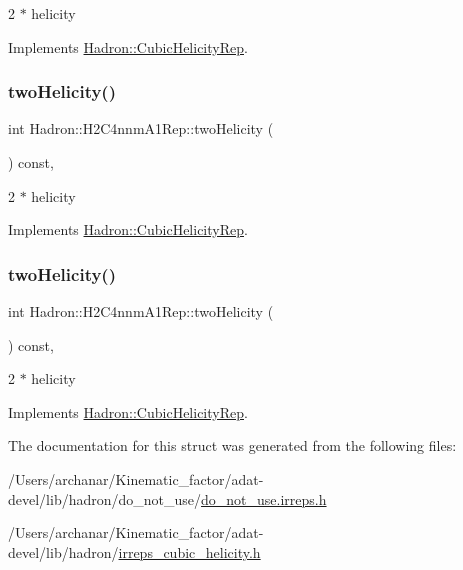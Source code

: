 2 $\ast$ helicity 

Implements \mbox{\hyperlink{structHadron_1_1CubicHelicityRep_af507aa56fc2747eacc8cb6c96db31ecc}{Hadron\+::\+Cubic\+Helicity\+Rep}}.

\mbox{\label{structHadron_1_1H2C4nnmA1Rep_ae55afbd5a5aede69fcb5415b54b00b07}} 
\subsubsection{\texorpdfstring{twoHelicity()}{twoHelicity()}\hspace{0.1cm}{\footnotesize\ttfamily [2/3]}}
{\footnotesize\ttfamily int Hadron\+::\+H2\+C4nnm\+A1\+Rep\+::two\+Helicity (\begin{DoxyParamCaption}{ }\end{DoxyParamCaption}) const\hspace{0.3cm}{\ttfamily [inline]}, {\ttfamily [virtual]}}

2 $\ast$ helicity 

Implements \mbox{\hyperlink{structHadron_1_1CubicHelicityRep_af507aa56fc2747eacc8cb6c96db31ecc}{Hadron\+::\+Cubic\+Helicity\+Rep}}.

\mbox{\label{structHadron_1_1H2C4nnmA1Rep_ae55afbd5a5aede69fcb5415b54b00b07}} 
\subsubsection{\texorpdfstring{twoHelicity()}{twoHelicity()}\hspace{0.1cm}{\footnotesize\ttfamily [3/3]}}
{\footnotesize\ttfamily int Hadron\+::\+H2\+C4nnm\+A1\+Rep\+::two\+Helicity (\begin{DoxyParamCaption}{ }\end{DoxyParamCaption}) const\hspace{0.3cm}{\ttfamily [inline]}, {\ttfamily [virtual]}}

2 $\ast$ helicity 

Implements \mbox{\hyperlink{structHadron_1_1CubicHelicityRep_af507aa56fc2747eacc8cb6c96db31ecc}{Hadron\+::\+Cubic\+Helicity\+Rep}}.



The documentation for this struct was generated from the following files\+:\begin{DoxyCompactItemize}
\item 
/\+Users/archanar/\+Kinematic\+\_\+factor/adat-\/devel/lib/hadron/do\+\_\+not\+\_\+use/\mbox{\hyperlink{adat-devel_2lib_2hadron_2do__not__use_2do__not__use_8irreps_8h}{do\+\_\+not\+\_\+use.\+irreps.\+h}}\item 
/\+Users/archanar/\+Kinematic\+\_\+factor/adat-\/devel/lib/hadron/\mbox{\hyperlink{adat-devel_2lib_2hadron_2irreps__cubic__helicity_8h}{irreps\+\_\+cubic\+\_\+helicity.\+h}}\end{DoxyCompactItemize}
